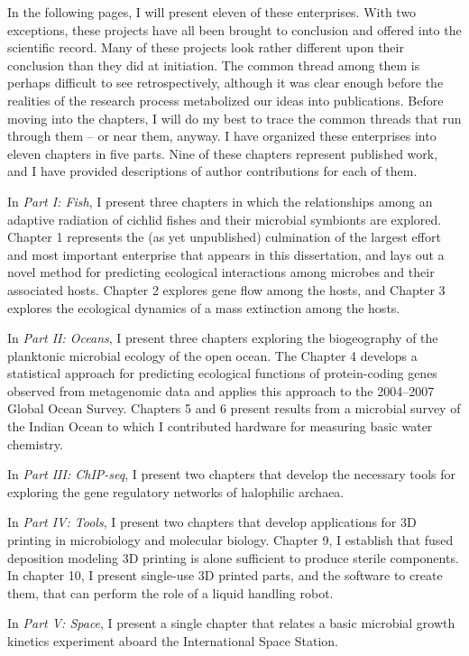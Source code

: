 In the following pages, I will present eleven of these enterprises. With two exceptions, these projects have all been brought to conclusion and offered into the scientific record. Many of these projects look rather different upon their conclusion than they did at initiation. The common thread among them is perhaps difficult to see retrospectively, although it was clear enough before the realities of the research process metabolized our ideas into publications. Before moving into the chapters, I will do my best to trace the common threads that run through them -- or near them, anyway. I have organized these enterprises into eleven chapters in five parts. Nine of these chapters represent published work, and I have provided descriptions of author contributions for each of them. 

In {\em Part I: Fish}, I present three chapters in which the relationships among an adaptive radiation of cichlid fishes and their microbial symbionts are explored. Chapter 1 represents the (as yet unpublished) culmination of the largest effort and most important enterprise that appears in this dissertation, and lays out a novel method for predicting ecological interactions among microbes and their associated hosts. Chapter 2 explores gene flow among the hosts, and Chapter 3 explores the ecological dynamics of a mass extinction among the hosts.

In {\em Part II: Oceans}, I present three chapters exploring the biogeography of the planktonic microbial ecology of the open ocean. The Chapter 4 develops a statistical approach for predicting ecological functions of protein-coding genes observed from metagenomic data and applies this approach to the 2004--2007 Global Ocean Survey. Chapters 5 and 6 present results from a microbial survey of the Indian Ocean to which I contributed hardware for measuring basic water chemistry.

In {\em Part III: ChIP-seq}, I present two chapters that develop the necessary tools for exploring the gene regulatory networks of halophilic archaea.

In {\em Part IV: Tools}, I present two chapters that develop applications for 3D printing in microbiology and molecular biology. Chapter 9, I establish that fused deposition modeling 3D printing is alone sufficient to produce sterile components. In chapter 10, I present single-use 3D printed parts, and the software to create them, that can perform the role of a liquid handling robot. 

In {\em Part V: Space}, I present a single chapter that relates a basic microbial growth kinetics experiment aboard the International Space Station.

